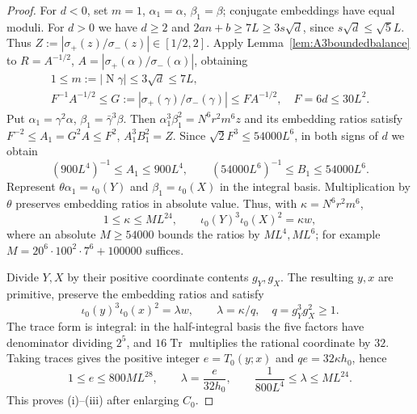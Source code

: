 \documentclass[11pt,reqno]{amsart}
\theoremstyle{definition}
\theoremstyle{remark}
\numberwithin{equation}{section}
\newcommand{\Nm}{\operatorname{N}}
\begin{document}
\begin{proof}
For $d<0$, set $m=1$, $\alpha_1=\alpha$, $\beta_1=\beta$; conjugate
embeddings have equal moduli. For $d>0$ we have $d\ge2$ and
$2an+b\ge7L\ge3s\sqrt d$, since $s\sqrt d\le\sqrt5L$. Thus
$Z:=|\sigma_+(z)/\sigma_-(z)|\in[1/2,2]$.
Apply Lemma~\ref{lem:A3boundedbalance} to
$R=A^{-1/2}$, $A=|\sigma_+(\alpha)/\sigma_-(\alpha)|$, obtaining
\[
 \begin{gathered}
 1\le m:=|\Nm\gamma|\le3\sqrt d\le7L,\\
 F^{-1}A^{-1/2}\le G:=|\sigma_+(\gamma)/\sigma_-(\gamma)|
 \le FA^{-1/2},\quad F=6d\le30L^2.
 \end{gathered}
\]
Put $\alpha_1=\gamma^2\alpha$, $\beta_1=\bar\gamma^3\beta$.
Then $\alpha_1^3\beta_1^2=N^6r^2m^6z$ and its embedding ratios satisfy
$F^{-2}\le A_1=G^2A\le F^2$, $A_1^3B_1^2=Z$.
Since $\sqrt2F^3\le54000L^6$, in both signs of $d$ we obtain
\begin{equation}
 (900L^4)^{-1}\le A_1\le900L^4,\qquad
 (54000L^6)^{-1}\le B_1\le54000L^6.              \label{eq:arith-7}
\end{equation}
Represent $\theta\alpha_1=\iota_0(Y)$ and $\beta_1=\iota_0(X)$ in
the integral basis. Multiplication by $\theta$ preserves embedding
ratios in absolute value. Thus, with $\kappa=N^6r^2m^6$,
\begin{equation}
 1\le\kappa\le ML^{24},\qquad
 \iota_0(Y)^3\iota_0(X)^2=\kappa w,              \label{eq:arith-8}
\end{equation}
where an absolute $M\ge54000$ bounds the ratios by $ML^4,ML^6$;
for example $M=20^6\cdot100^2\cdot7^6+100000$ suffices.

Divide $Y,X$ by their positive coordinate contents $g_Y,g_X$.
The resulting $y,x$ are primitive, preserve the embedding ratios and satisfy
\begin{equation}
 \iota_0(y)^3\iota_0(x)^2=\lambda w,\qquad
 \lambda=\kappa/q,\quad q=g_Y^3g_X^2\ge1.        \label{eq:arith-9}
\end{equation}
The trace form is integral: in the half-integral basis the five factors
have denominator dividing $2^5$, and $16\operatorname{Tr}$ multiplies
the rational coordinate by $32$. Taking traces gives the positive integer
$e=T_0(y;x)$ and $qe=32\kappa h_0$, hence
\begin{equation}
 1\le e\le800ML^{28},\qquad
 \lambda=\frac e{32h_0},\qquad
 \frac1{800L^4}\le\lambda\le ML^{24}.            \label{eq:arith-10}
\end{equation}
This proves (i)--(iii) after enlarging $C_0$.


\end{proof}
\end{document}
